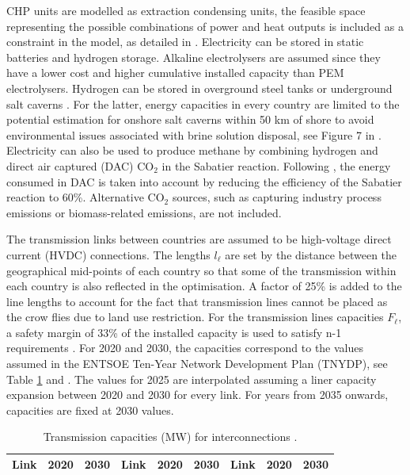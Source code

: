 \documentclass[3p]{elsarticle} %
\begin{document}
CHP units are modelled as extraction condensing units, the feasible space representing the possible combinations of power and heat outputs is included as a constraint in the model, as detailed in \cite{Brown_2018}. Electricity can be stored in static batteries and hydrogen storage. Alkaline electrolysers are assumed since they have a lower cost \cite{DEA_2019} and higher cumulative installed capacity \cite{Staffell_2019} than PEM electrolysers. Hydrogen can be stored in overground steel tanks or underground salt caverns \cite{Staffell_2019}. For the latter, energy capacities in every country are limited to the potential estimation for onshore salt caverns within 50 km of shore to avoid environmental issues associated with brine solution disposal, see Figure 7 in \cite{Caglayan_2019}. Electricity can also be used to produce methane by combining hydrogen and direct air captured (DAC) CO$_2$ in the Sabatier reaction. Following \cite{Brown_2018}, the energy consumed in DAC is taken into account by reducing the efficiency of the Sabatier reaction to 60\%. Alternative CO$_2$ sources, such as capturing industry process emissions or biomass-related emissions, are not included. \

The transmission links between countries are assumed to be high-voltage direct current (HVDC) connections. The lengths $l_{\ell}$ are set by the distance between the geographical mid-points of each country so that some of the transmission within each country is also reflected in the optimisation. A factor of 25\% is added to the line lengths to account for the fact that transmission lines cannot be placed as the crow flies due to land use restriction. For the transmission lines capacities $F_{\ell}$, a safety margin of 33\% of the installed capacity is used to satisfy n-1 requirements \cite{Brown_2016}. For 2020 and 2030, the capacities correspond to the values assumed in the ENTSOE Ten-Year Network Development Plan (TNYDP), see Table \ref{tab_interconnections} and \cite{TYNDP2016}. The values for 2025 are interpolated assuming a liner capacity expansion between 2020 and 2030 for every link. For years from 2035 onwards, capacities are fixed at 2030 values. \


\begin{table}[!b]
\footnotesize
\centering
\begin{threeparttable}
\caption{Transmission capacities (MW) for interconnections \cite{TYNDP2016}.} \label{tab_interconnections}
\centering

\begin{tabularx}{10.5cm}{|lrr|lrr|lrr|}
\toprule
Link & 2020 & 2030 & Link & 2020 & 2030 & Link & 2020 & 2030  \\
\midrule

\bottomrule
\end{tabularx}
\end{threeparttable}
\end{table}
\end{document}

